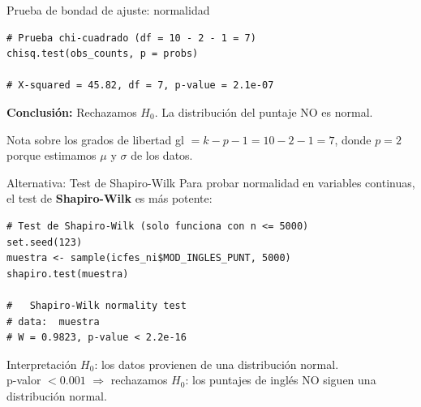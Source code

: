 \documentclass[aspectratio=169, 11pt]{beamer}
\begin{document}
\begin{frame}[fragile]{Prueba de bondad de ajuste: normalidad}
\begin{lstlisting}
# Prueba chi-cuadrado (df = 10 - 2 - 1 = 7)
chisq.test(obs_counts, p = probs)

# X-squared = 45.82, df = 7, p-value = 2.1e-07
\end{lstlisting}

\vspace{0.3cm}
\textbf{Conclusión:} Rechazamos $H_0$. La distribución del puntaje NO es normal.

\vspace{0.2cm}
\begin{alertblock}{Nota sobre los grados de libertad}
gl $= k - p - 1 = 10 - 2 - 1 = 7$, donde $p = 2$ porque estimamos $\mu$ y $\sigma$ de los datos.
\end{alertblock}
\end{frame}

\begin{frame}[fragile]{Alternativa: Test de Shapiro-Wilk}
Para probar normalidad en variables continuas, el test de \textbf{Shapiro-Wilk} es más potente:
\begin{lstlisting}
# Test de Shapiro-Wilk (solo funciona con n <= 5000)
set.seed(123)
muestra <- sample(icfes_ni$MOD_INGLES_PUNT, 5000)
shapiro.test(muestra)

#   Shapiro-Wilk normality test
# data:  muestra
# W = 0.9823, p-value < 2.2e-16
\end{lstlisting}

\begin{alertblock}{Interpretación}
$H_0$: los datos provienen de una distribución normal.\\
p-valor $< 0.001$ $\Rightarrow$ rechazamos $H_0$: los puntajes de inglés NO siguen una distribución normal.
\end{alertblock}
\end{frame}
\end{document}
